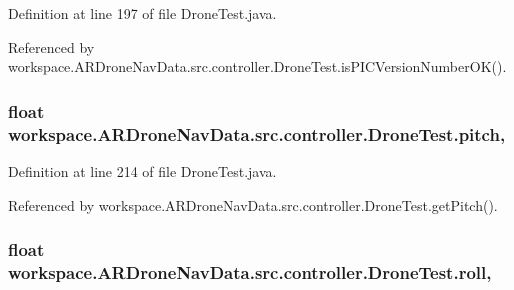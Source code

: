 Definition at line 197 of file Drone\+Test.\+java.



Referenced by workspace.\+A\+R\+Drone\+Nav\+Data.\+src.\+controller.\+Drone\+Test.\+is\+P\+I\+C\+Version\+Number\+O\+K().

\hypertarget{classworkspace_1_1_a_r_drone_nav_data_1_1src_1_1controller_1_1_drone_test_a5267867dd0cbed3adb619ea898ac0ea1}{}
\subsubsection[{pitch}]{\setlength{\rightskip}{0pt plus 5cm}float workspace.\+A\+R\+Drone\+Nav\+Data.\+src.\+controller.\+Drone\+Test.\+pitch\hspace{0.3cm}{\ttfamily [static]}, {\ttfamily [protected]}}\label{classworkspace_1_1_a_r_drone_nav_data_1_1src_1_1controller_1_1_drone_test_a5267867dd0cbed3adb619ea898ac0ea1}


Definition at line 214 of file Drone\+Test.\+java.



Referenced by workspace.\+A\+R\+Drone\+Nav\+Data.\+src.\+controller.\+Drone\+Test.\+get\+Pitch().

\hypertarget{classworkspace_1_1_a_r_drone_nav_data_1_1src_1_1controller_1_1_drone_test_a51d40a655d9e34719fbdfffcd025eaa5}{}
\subsubsection[{roll}]{\setlength{\rightskip}{0pt plus 5cm}float workspace.\+A\+R\+Drone\+Nav\+Data.\+src.\+controller.\+Drone\+Test.\+roll\hspace{0.3cm}{\ttfamily [static]}, {\ttfamily [protected]}}\label{classworkspace_1_1_a_r_drone_nav_data_1_1src_1_1controller_1_1_drone_test_a51d40a655d9e34719fbdfffcd025eaa5}


